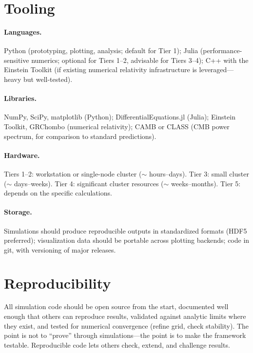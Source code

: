 \section{Tooling}

\paragraph{Languages.} Python (prototyping, plotting, analysis; default for
Tier 1); Julia (performance-sensitive numerics; optional for Tiers 1--2,
advisable for Tiers 3--4); C++ with the Einstein Toolkit (if existing numerical
relativity infrastructure is leveraged---heavy but well-tested).

\paragraph{Libraries.} NumPy, SciPy, matplotlib (Python); DifferentialEquations.jl
(Julia); Einstein Toolkit, GRChombo (numerical relativity); CAMB or CLASS (CMB
power spectrum, for comparison to standard predictions).

\paragraph{Hardware.} Tiers 1--2: workstation or single-node cluster
($\sim$ hours--days). Tier 3: small cluster ($\sim$ days--weeks). Tier 4:
significant cluster resources ($\sim$ weeks--months). Tier 5: depends on the
specific calculations.

\paragraph{Storage.} Simulations should produce reproducible outputs in
standardized formats (HDF5 preferred); visualization data should be portable
across plotting backends; code in git, with versioning of major releases.

\section{Reproducibility}

All simulation code should be open source from the start, documented well enough
that others can reproduce results, validated against analytic limits where they
exist, and tested for numerical convergence (refine grid, check stability). The
point is not to ``prove'' \SCT through simulations---the point is to make the
framework testable. Reproducible code lets others check, extend, and challenge
results.
